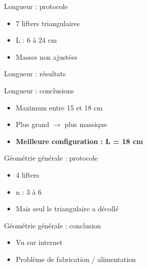 \documentclass{beamer}
\begin{document}
	\begin{frame}{Longueur : protocole}
		\begin{itemize}
			\item 7 lifters triangulaires
			\item L : 6 à 24 cm
			\item Masses non ajustées
		\end{itemize}
	\end{frame}

	\begin{frame}{Longueur : résultats}
	\end{frame}

	\begin{frame}{Longueur : conclusions}
		\begin{itemize}
			\item Maximum entre 15 et 18 cm
			\item Plus grand $\longrightarrow$ plus massique
			\item \textbf{Meilleure configuration : L = 18 cm}
		\end{itemize}
	\end{frame}

	\begin{frame}{Géométrie générale : protocole}
		\begin{itemize}
			\item 4 lifters
			\item n : 3 à 6
			\item Mais seul le triangulaire a décollé
		\end{itemize}
	\end{frame}

	\begin{frame}{Géométrie générale : conclusion}
		\begin{itemize}
			\item Vu sur internet
			\item Problème de fabrication / alimentation
		\end{itemize}
	\end{frame}
\end{document}
